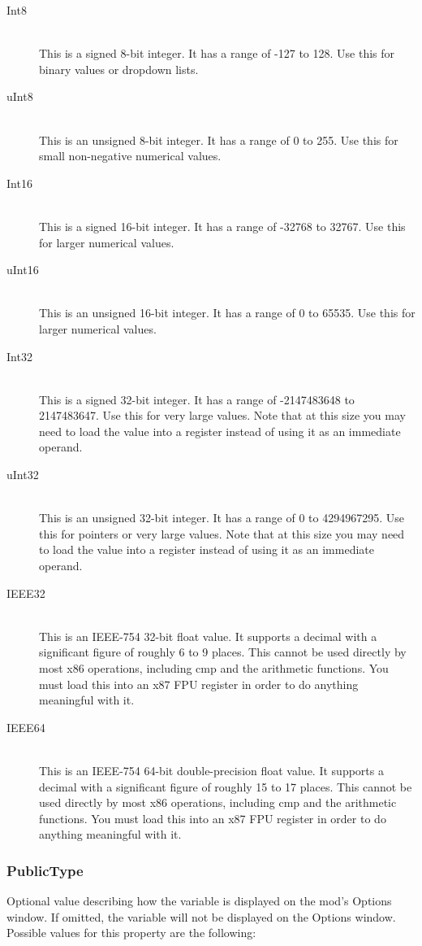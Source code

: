 \documentclass[12pt,a4paper,notitlepage]{article}
\begin{document}
\begin{description}
\item[Int8] \hfill \\ 
    This is a signed 8-bit integer. It has a range of -127 to 128. Use this for binary values or dropdown lists.
\item[uInt8] \hfill \\ 
    This is an unsigned 8-bit integer. It has a range of 0 to 255. Use this for small non-negative numerical values.
\item[Int16] \hfill \\
    This is a signed 16-bit integer. It has a range of -32768 to 32767. Use this for larger numerical values.
\item[uInt16] \hfill \\
    This is an unsigned 16-bit integer. It has a range of 0 to 65535. Use this for larger numerical values.
\item[Int32] \hfill \\
    This is a signed 32-bit integer. It has a range of -2147483648 to 2147483647. Use this for very large values. Note that at this size you may need to load the value into a register instead of using it as an immediate operand.
\item[uInt32] \hfill \\
    This is an unsigned 32-bit integer. It has a range of 0 to 4294967295. Use this for pointers or very large values. Note that at this size you may need to load the value into a register instead of using it as an immediate operand.
\item[IEEE32] \hfill \\
    This is an IEEE-754 32-bit float value. It supports a decimal with a significant figure of roughly 6 to 9 places. This cannot be used directly by most x86 operations, including cmp and the arithmetic functions. You must load this into an x87 FPU register in order to do anything meaningful with it.
\item[IEEE64] \hfill \\
    This is an IEEE-754 64-bit double-precision float value. It supports a decimal with a significant figure of roughly 15 to 17 places. This cannot be used directly by most x86 operations, including cmp and the arithmetic functions. You must load this into an x87 FPU register in order to do anything meaningful with it.
\end{description}

\subsubsection{PublicType}
\label{subsubsec:create-var-public}
Optional value describing how the variable is displayed on the mod's Options window. If omitted, the variable will not be displayed on the Options window. Possible values for this property are the following:
\end{document}
